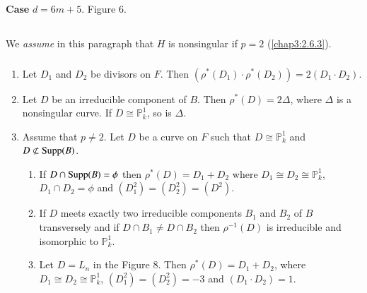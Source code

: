 \medskip
\noindent
{\bf Case} $d=6m+5$. Figure 6.

\subsection{}\label{chap3:2.7}
We {\em assume} in this paragraph that $H$ is nonsingular if $p=2$
(\cf \ref{chap3:2.6.3}).

\subsubsection{}\label{chap3:2.7.1}
\begin{lemma*}
  \begin{enumerate}
    \renewcommand{\labelenumi}{\rm(\theenumi)}
  \item Let $D_{1}$ and $D_{2}$ be divisors on $F$. Then
    $(\rho^{\ast}(D_{1})\cdot \rho^{\ast}(D_{2}))=2(D_{1}\cdot D_{2})$.
    
  \item Let $D$ be an irreducible component of $B$. Then
    $\rho^{\ast}(D)=2\Delta$, where $\Delta$ is a nonsingular curve. If
    $D\cong \mathbb{P}^{1}_{k}$, so is $\Delta$.
    
  \item Assume that $p\neq 2$. Let $D$ be a curve on $F$ such that
    $D\cong \mathbb{P}^{1}_{k}$ and $D\not\subset \operatorname{Supp} (B)$.
    \begin{enumerate}
      \renewcommand{\theenumii}{\roman{enumii}}
      \renewcommand{\labelenumii}{\rm(\theenumii)}
    \item If $D\cap \operatorname{Supp}(B)=\phi$ then $\rho^{\ast}(D)=D_{1}+D_{2}$ where
      $D_{1}\cong D_{2}\cong \mathbb{P}^{1}_{k}$, $D_{1}\cap D_{2}=\phi$
      and $(D^{2}_{1})=(D^{2}_{2})=(D^{2})$.
      
    \item If $D$ meets exactly two irreducible components $B_{1}$ and
      $B_{2}$ of $B$ transversely and if $D\cap B_{1}\neq D\cap B_{2}$
      then $\rho^{-1}(D)$ is irreducible and isomorphic to
      $\mathbb{P}^{1}_{k}$.
      
    \item Let $D=L_{n}$ in the Figure $8$. Then
      $\rho^{\ast}(D)=D_{1}+D_{2}$, where $D_{1}\cong D_{2}\cong
      \mathbb{P}^{1}_{k}$, $(D^{2}_{1})=(D^{2}_{2})=-3$ and $(D_{1}\cdot
      D_{2})=1$. 
    \end{enumerate}
  \end{enumerate}
\end{lemma*}

